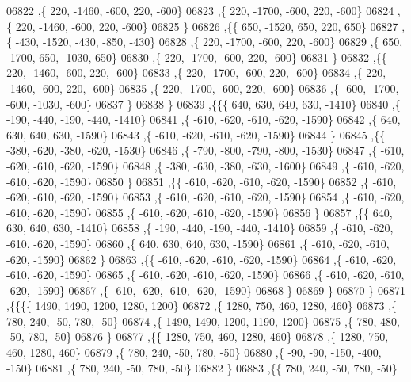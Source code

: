 \begin{DoxyCode}
06822     ,\{   220, -1460,  -600,   220,  -600\}
06823     ,\{   220, -1700,  -600,   220,  -600\}
06824     ,\{   220, -1460,  -600,   220,  -600\}
06825     \}
06826    ,\{\{   650, -1520,   650,   220,   650\}
06827     ,\{  -430, -1520,  -430,  -850,  -430\}
06828     ,\{   220, -1700,  -600,   220,  -600\}
06829     ,\{   650, -1700,   650, -1030,   650\}
06830     ,\{   220, -1700,  -600,   220,  -600\}
06831     \}
06832    ,\{\{   220, -1460,  -600,   220,  -600\}
06833     ,\{   220, -1700,  -600,   220,  -600\}
06834     ,\{   220, -1460,  -600,   220,  -600\}
06835     ,\{   220, -1700,  -600,   220,  -600\}
06836     ,\{  -600, -1700,  -600, -1030,  -600\}
06837     \}
06838    \}
06839   ,\{\{\{   640,   630,   640,   630, -1410\}
06840     ,\{  -190,  -440,  -190,  -440, -1410\}
06841     ,\{  -610,  -620,  -610,  -620, -1590\}
06842     ,\{   640,   630,   640,   630, -1590\}
06843     ,\{  -610,  -620,  -610,  -620, -1590\}
06844     \}
06845    ,\{\{  -380,  -620,  -380,  -620, -1530\}
06846     ,\{  -790,  -800,  -790,  -800, -1530\}
06847     ,\{  -610,  -620,  -610,  -620, -1590\}
06848     ,\{  -380,  -630,  -380,  -630, -1600\}
06849     ,\{  -610,  -620,  -610,  -620, -1590\}
06850     \}
06851    ,\{\{  -610,  -620,  -610,  -620, -1590\}
06852     ,\{  -610,  -620,  -610,  -620, -1590\}
06853     ,\{  -610,  -620,  -610,  -620, -1590\}
06854     ,\{  -610,  -620,  -610,  -620, -1590\}
06855     ,\{  -610,  -620,  -610,  -620, -1590\}
06856     \}
06857    ,\{\{   640,   630,   640,   630, -1410\}
06858     ,\{  -190,  -440,  -190,  -440, -1410\}
06859     ,\{  -610,  -620,  -610,  -620, -1590\}
06860     ,\{   640,   630,   640,   630, -1590\}
06861     ,\{  -610,  -620,  -610,  -620, -1590\}
06862     \}
06863    ,\{\{  -610,  -620,  -610,  -620, -1590\}
06864     ,\{  -610,  -620,  -610,  -620, -1590\}
06865     ,\{  -610,  -620,  -610,  -620, -1590\}
06866     ,\{  -610,  -620,  -610,  -620, -1590\}
06867     ,\{  -610,  -620,  -610,  -620, -1590\}
06868     \}
06869    \}
06870   \}
06871  ,\{\{\{\{  1490,  1490,  1200,  1280,  1200\}
06872     ,\{  1280,   750,   460,  1280,   460\}
06873     ,\{   780,   240,   -50,   780,   -50\}
06874     ,\{  1490,  1490,  1200,  1190,  1200\}
06875     ,\{   780,   480,   -50,   780,   -50\}
06876     \}
06877    ,\{\{  1280,   750,   460,  1280,   460\}
06878     ,\{  1280,   750,   460,  1280,   460\}
06879     ,\{   780,   240,   -50,   780,   -50\}
06880     ,\{   -90,   -90,  -150,  -400,  -150\}
06881     ,\{   780,   240,   -50,   780,   -50\}
06882     \}
06883    ,\{\{   780,   240,   -50,   780,   -50\}

\end{DoxyCode}
